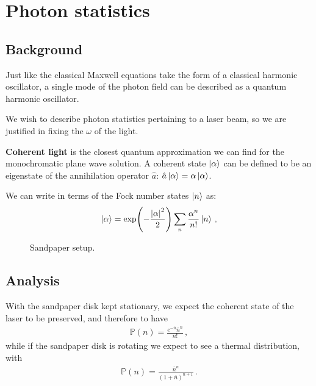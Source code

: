 \documentclass[main.tex]{subfiles}
\begin{document}
\section{Photon statistics}

\subsection{Background}

Just like the classical Maxwell equations take the form of a classical harmonic oscillator, a single mode of the photon field can be described as a quantum harmonic oscillator.

We wish to describe photon statistics pertaining to a laser beam, so we are justified in fixing the \(\omega \) of the light.

\textbf{Coherent light} is the closest quantum approximation we can find for the monochromatic plane wave solution. A coherent state \(\ket{\alpha } \) can be defined to be an eigenstate of the annihilation operator \(\hat{a}\): \(\hat{a} \ket{\alpha } = \alpha \ket{\alpha }\). 

We can write in terms of the Fock number states \(\ket{n}\) as: 
%
\begin{align}
\ket{\alpha } = \exp(- \frac{\abs{\alpha }^2}{2}) 
\sum _{n} \frac{\alpha^{n}}{n!} \ket{n}
\,,
\end{align}
%
 

\begin{figure}[ht]
\centering

\caption{Sandpaper setup.}
\label{fig:sandpaper}
\end{figure}

\subsection{Analysis}

With the sandpaper disk kept stationary, we expect the coherent state of the laser to be preserved, and therefore to have 
%
\begin{align}
\mathbb{P} (n) = \frac{e^{-\overline{n}} \overline{n}^{n}}{n!}
\,,
\end{align}
%
while if the sandpaper disk is rotating we expect to see a thermal distribution, with 
%
\begin{align}
\mathbb{P} (n) = \frac{\overline{n}^{n}}{(1 + \overline{n})^{n+1}}
\,.
\end{align}
\end{document}
